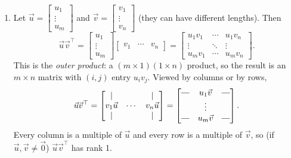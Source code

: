 \documentclass[11pt]{article}
\newcommand{\rotvert}{\rotatebox[origin=c]{90}{$\vert$}}
\begin{document}
\begin{enumerate}
    \item[(e)] Let $\vec{u}= \begin{bmatrix} u_1 \\ \vdots \\ u_m \end{bmatrix}$ and $\vec{v}= \begin{bmatrix} v_1 \\ \vdots \\ v_n \end{bmatrix}$ (they can have different lengths). Then \[ \vec{u}\vec{v}^\top= \begin{bmatrix} u_1 \\ \vdots \\ u_m \end{bmatrix} \begin{bmatrix} v_1 & \cdots & v_n \end{bmatrix} = \begin{bmatrix} u_1v_1 & \cdots & u_1v_n \\ \vdots & \ddots & \vdots \\ u_mv_1 & \cdots & u_mv_n \end{bmatrix}. \] This is the \emph{outer product}: a $(m\times 1)(1\times n)$ product, so the result is an $m\times n$ matrix with $(i,j)$ entry $u_iv_j$. Viewed by columns or by rows, \[ \vec{u}\vec{v}^\top = \begin{bmatrix} \mid &  & \mid \\ v_1\vec{u} & \cdots & v_n\vec{u} \\ \mid &  & \mid \end{bmatrix} = \begin{bmatrix} \rotvert & u_1\vec{v} & \rotvert \\  & \vdots &  \\ \rotvert & u_m\vec{v} & \rotvert \end{bmatrix}. \] Every column is a multiple of $\vec{u}$ and every row is a multiple of $\vec{v}$, so (if $\vec{u},\vec{v}\neq\vec{0}$) $\vec{u}\vec{v}^\top$ has rank 1.
\end{enumerate}
\end{document}

